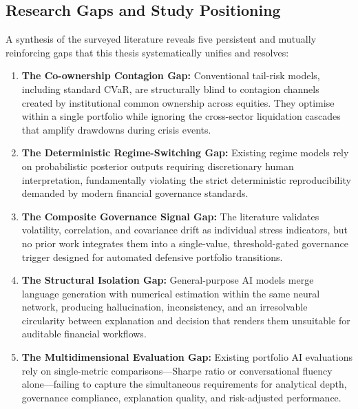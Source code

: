 \documentclass[11pt]{article}
\begin{document}
\subsection{Research Gaps and Study Positioning}
A synthesis of the surveyed literature reveals five persistent and mutually reinforcing gaps that this thesis systematically unifies and resolves:

\begin{enumerate}
  \item \textbf{The Co-ownership Contagion Gap:} Conventional tail-risk models, including standard CVaR, are structurally blind to contagion channels created by institutional common ownership across equities. They optimise within a single portfolio while ignoring the cross-sector liquidation cascades that amplify drawdowns during crisis events.
  \item \textbf{The Deterministic Regime-Switching Gap:} Existing regime models rely on probabilistic posterior outputs requiring discretionary human interpretation, fundamentally violating the strict deterministic reproducibility demanded by modern financial governance standards.
  \item \textbf{The Composite Governance Signal Gap:} The literature validates volatility, correlation, and covariance drift as individual stress indicators, but no prior work integrates them into a single-value, threshold-gated governance trigger designed for automated defensive portfolio transitions.
  \item \textbf{The Structural Isolation Gap:} General-purpose AI models merge language generation with numerical estimation within the same neural network, producing hallucination, inconsistency, and an irresolvable circularity between explanation and decision that renders them unsuitable for auditable financial workflows.
  \item \textbf{The Multidimensional Evaluation Gap:} Existing portfolio AI evaluations rely on single-metric comparisons---Sharpe ratio or conversational fluency alone---failing to capture the simultaneous requirements for analytical depth, governance compliance, explanation quality, and risk-adjusted performance.
\end{enumerate}
\end{document}
